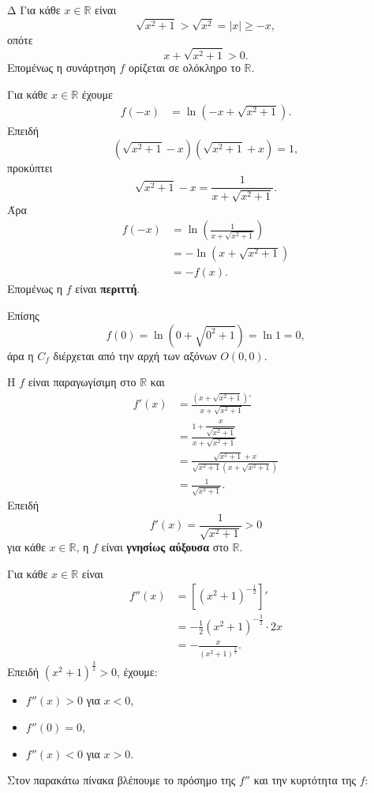\begin{thema}{Δ}
Για κάθε $x\in\mathbb{R}$ είναι
\[
\sqrt{x^2+1}>\sqrt{x^2}=|x|\geq -x,
\]
οπότε
\[
x+\sqrt{x^2+1}>0.
\]
Επομένως η συνάρτηση $f$ ορίζεται σε ολόκληρο το $\mathbb{R}$.
\begin{erwthma}
\item Για κάθε $x\in\mathbb{R}$ έχουμε
\begin{align*}
f(-x)
&=\ln\left(-x+\sqrt{x^2+1}\right).
\end{align*}
Επειδή
\[
\left(\sqrt{x^2+1}-x\right)\left(\sqrt{x^2+1}+x\right)=1,
\]
προκύπτει
\[
\sqrt{x^2+1}-x=\frac{1}{x+\sqrt{x^2+1}}.
\]
Άρα
\begin{align*}
f(-x)
&=\ln\left(\frac{1}{x+\sqrt{x^2+1}}\right)\\
&=-\ln\left(x+\sqrt{x^2+1}\right)\\
&=-f(x).
\end{align*}
Επομένως η $f$ είναι \textbf{περιττή}.

Επίσης
\[
f(0)=\ln\left(0+\sqrt{0^2+1}\right)=\ln1=0,
\]
άρα η $C_f$ διέρχεται από την αρχή των αξόνων $O(0,0)$.

\item Η $f$ είναι παραγωγίσιμη στο $\mathbb{R}$ και
\begin{align*}
f'(x)
&=\frac{\left(x+\sqrt{x^2+1}\right)'}{x+\sqrt{x^2+1}}\\
&=\frac{1+\dfrac{x}{\sqrt{x^2+1}}}{x+\sqrt{x^2+1}}\\
&=\frac{\sqrt{x^2+1}+x}
{\sqrt{x^2+1}\left(x+\sqrt{x^2+1}\right)}\\
&=\frac{1}{\sqrt{x^2+1}}.
\end{align*}
Επειδή
\[
f'(x)=\frac{1}{\sqrt{x^2+1}}>0
\]
για κάθε $x\in\mathbb{R}$, η $f$ είναι \textbf{γνησίως αύξουσα} στο $\mathbb{R}$.

\item Για κάθε $x\in\mathbb{R}$ είναι
\begin{align*}
f''(x)
&=\left[\left(x^2+1\right)^{-\frac{1}{2}}\right]'\\
&=-\frac{1}{2}\left(x^2+1\right)^{-\frac{3}{2}}\cdot2x\\
&=-\frac{x}{(x^2+1)^{\frac{3}{2}}}.
\end{align*}
Επειδή $(x^2+1)^{\frac{3}{2}}>0$, έχουμε:
\begin{itemize}
\item $f''(x)>0$ για $x<0$,
\item $f''(0)=0$,
\item $f''(x)<0$ για $x>0$.
\end{itemize}
Στον παρακάτω πίνακα βλέπουμε το πρόσημο της $f''$ και την κυρτότητα της $f$:
\begin{center}
\end{center}


\end{erwthma}
\end{thema}
